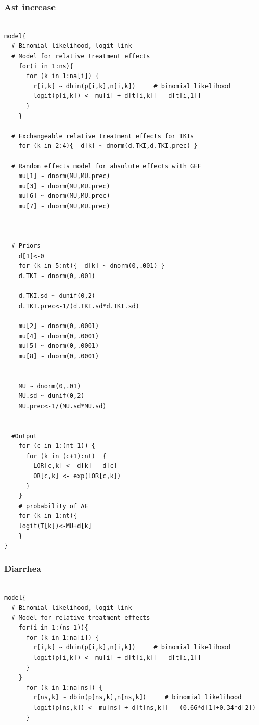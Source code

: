 \documentclass[11pt,final,fleqn]{article}\usepackage[]{graphicx}\usepackage[]{color}
\theoremstyle{plain}
\begin{document}
\begin{appendices}
\begin{verbatim}
\end{verbatim}

\subsubsection{Ast increase} 
\begin{verbatim} 

model{
  # Binomial likelihood, logit link
  # Model for relative treatment effects
    for(i in 1:ns){                  
      for (k in 1:na[i]) {               
        r[i,k] ~ dbin(p[i,k],n[i,k])     # binomial likelihood
        logit(p[i,k]) <- mu[i] + d[t[i,k]] - d[t[i,1]]  
      }
    }   
  
  # Exchangeable relative treatment effects for TKIs
    for (k in 2:4){  d[k] ~ dnorm(d.TKI,d.TKI.prec) }
  
  # Random effects model for absolute effects with GEF
    mu[1] ~ dnorm(MU,MU.prec) 
    mu[3] ~ dnorm(MU,MU.prec) 
    mu[6] ~ dnorm(MU,MU.prec) 
    mu[7] ~ dnorm(MU,MU.prec)
    
       
       
  # Priors
    d[1]<-0                                      
    for (k in 5:nt){  d[k] ~ dnorm(0,.001) }     
    d.TKI ~ dnorm(0,.001)
    
    d.TKI.sd ~ dunif(0,2) 
    d.TKI.prec<-1/(d.TKI.sd*d.TKI.sd)
    
    mu[2] ~ dnorm(0,.0001)                     
    mu[4] ~ dnorm(0,.0001)                       
    mu[5] ~ dnorm(0,.0001)                       
    mu[8] ~ dnorm(0,.0001)                       
                     
      
    MU ~ dnorm(0,.01)                         
    MU.sd ~ dunif(0,2) 
    MU.prec<-1/(MU.sd*MU.sd)
    
      
  #Output                                       
    for (c in 1:(nt-1)) {                        
      for (k in (c+1):nt)  { 
        LOR[c,k] <- d[k] - d[c]
        OR[c,k] <- exp(LOR[c,k])
      }  
    }
    # probability of AE
    for (k in 1:nt){ 
    logit(T[k])<-MU+d[k]
    }
}

\end{verbatim}

\subsubsection{Diarrhea} 
\begin{verbatim} 

model{
  # Binomial likelihood, logit link
  # Model for relative treatment effects
    for(i in 1:(ns-1)){                  
      for (k in 1:na[i]) {              
        r[i,k] ~ dbin(p[i,k],n[i,k])     # binomial likelihood
        logit(p[i,k]) <- mu[i] + d[t[i,k]] - d[t[i,1]]  
      }
    }   
      for (k in 1:na[ns]) {               
        r[ns,k] ~ dbin(p[ns,k],n[ns,k])     # binomial likelihood
        logit(p[ns,k]) <- mu[ns] + d[t[ns,k]] - (0.66*d[1]+0.34*d[2])  
      }
  

\end{verbatim}
\end{appendices}
\end{document}
